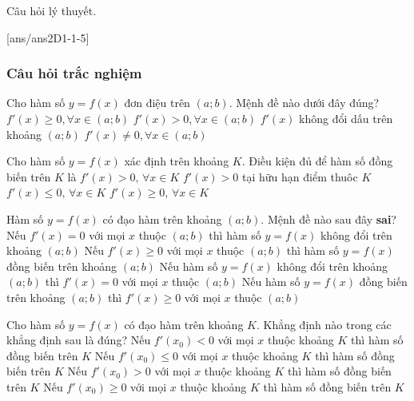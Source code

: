 \begin{dang}{Câu hỏi lý thuyết}.
\end{dang}
[ans/ans2D1-1-5]
\subsubsection{Câu hỏi trắc nghiệm}
\begin{ex}%
	Cho hàm số $y=f(x)$ đơn điệu trên $(a;b)$. Mệnh đề nào dưới đây đúng?
	\choice
	{$f'(x)\geq 0,\forall x\in(a;b)$}
	{$f'(x)>0,\forall x\in(a;b)$}
	{\True $f'(x)$ không đổi dấu trên khoảng $(a;b)$}
	{$f'(x)\neq 0,\forall x\in(a;b)$}
\end{ex}

\begin{ex}%
	Cho hàm số $y=f(x)$ xác định trên khoảng $K$. Điều kiện đủ để hàm số đồng biến trên $K$ là 
	\choice
	{$f'(x)>0,\,\forall x\in K$}
	{$f'(x)>0$ tại hữu hạn điểm thuôc $K$}
	{$f'(x)\leq 0,\,\forall x\in K$}
	{\True $f'(x)\geq 0,\,\forall x\in K$}
\end{ex}

\begin{ex}%
	Hàm số $y=f(x)$ có đạo hàm trên khoảng $(a;b)$. Mệnh đề nào sau đây \textbf{sai}?
	\choice
	{Nếu $f'(x)=0$ với mọi $x$ thuộc $(a;b)$ thì hàm số $y=f(x)$ không đổi trên khoảng $(a; b)$}
	{\True Nếu $f'(x)\geq 0$ với mọi $x$ thuộc $(a;b)$ thì hàm số $y=f(x)$ đồng biến trên khoảng $(a; b)$}
	{Nếu hàm số $y=f(x)$ không đổi trên khoảng $(a; b)$ thì $f'(x)=0$ với mọi $x$ thuộc $(a;b)$}
	{Nếu hàm số $y=f(x)$ đồng biến trên khoảng $(a; b)$ thì $f'(x)\geq 0$ với mọi $x$ thuộc $(a;b)$}
\end{ex}

\begin{ex}%
	Cho hàm số $y=f(x)$ có đạo hàm trên khoảng $K$. Khẳng định nào trong các khẳng định sau là đúng? 
	\choice
	{Nếu $f'(x_0)<0$ với mọi $x$ thuộc khoảng $K$ thì hàm số đồng biến trên $K$}
	{Nếu $f'(x_0)\leq 0$ với mọi $x$ thuộc khoảng $K$ thì hàm số đồng biến trên $K$}
	{\True Nếu $f'(x_0)>0$ với mọi $x$ thuộc khoảng $K$ thì hàm số đồng biến trên $K$}
	{Nếu $f'(x_0)\geq 0$ với mọi $x$ thuộc khoảng $K$ thì hàm số đồng biến trên $K$}
\end{ex}

